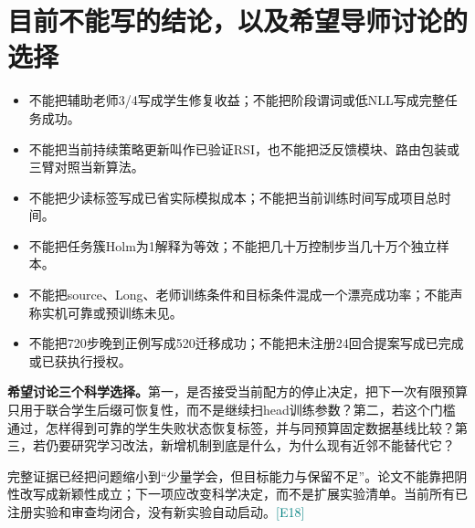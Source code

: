 \documentclass[UTF8,a4paper,fontset=none,zihao=-4]{ctexart}
\newcommand{\ev}[1]{\textcolor{teal}{\small[#1]}}
\begin{document}
\section{目前不能写的结论，以及希望导师讨论的选择}
\begin{itemize}
\item 不能把辅助老师3/4写成学生修复收益；不能把阶段谓词或低NLL写成完整任务成功。
\item 不能把当前持续策略更新叫作已验证RSI，也不能把泛反馈模块、路由包装或三臂对照当新算法。
\item 不能把少读标签写成已省实际模拟成本；不能把当前训练时间写成项目总时间。
\item 不能把任务簇Holm为1解释为等效；不能把几十万控制步当几十万个独立样本。
\item 不能把source、Long、老师训练条件和目标条件混成一个漂亮成功率；不能声称实机可靠或预训练未见。
\item 不能把720步晚到正例写成520迁移成功；不能把未注册24回合提案写成已完成或已获执行授权。
\end{itemize}
\textbf{希望讨论三个科学选择。}第一，是否接受当前配方的停止决定，把下一次有限预算只用于联合学生后缀可恢复性，而不是继续扫head训练参数？第二，若这个门槛通过，怎样得到可靠的学生失败状态恢复标签，并与同预算固定数据基线比较？第三，若仍要研究学习改法，新增机制到底是什么，为什么现有近邻不能替代它？

完整证据已经把问题缩小到“少量学会，但目标能力与保留不足”。论文不能靠把阴性改写成新颖性成立；下一项应改变科学决定，而不是扩展实验清单。当前所有已注册实验和审查均闭合，没有新实验自动启动。\ev{E18}
\end{document}
